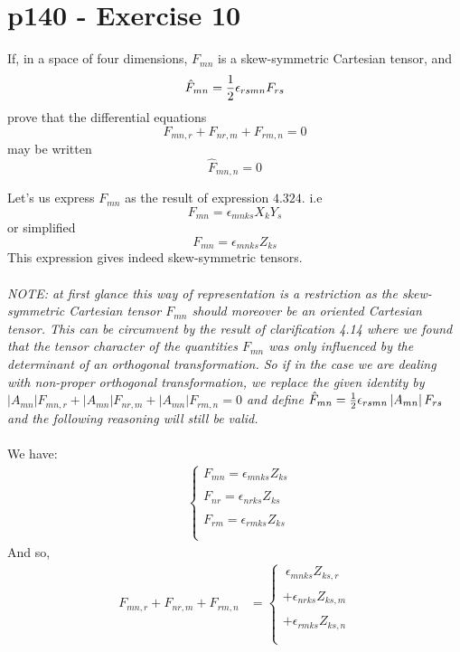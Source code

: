 \section{p140 - Exercise 10}
\begin{tcolorbox}
If, in a space of four dimensions, $F_{mn}$ is a skew-symmetric Cartesian tensor, and $$\hat{F}_{mn} = \frac{1}{2} \epsilon_{rsmn} F_{rs}$$
prove that the differential equations $$ F_{mn,r}+F_{nr,m}+F_{rm,n}=0$$ may be written $$\hat{F}_{mn,n} =0$$
\end{tcolorbox}
Let's us express $F_{mn}$ as the result of expression $\mathbf{4.324.} $ i.e $$F_{mn} = \epsilon_{mnks} X_kY_s$$ or simplified $$F_{mn} = \epsilon_{mnks} Z_{ks}$$
This expression gives indeed skew-symmetric tensors.\\\\
\textit{NOTE:  at first glance this way of representation is  a restriction as the  skew-symmetric Cartesian tensor $F_{mn}$ should moreover be an oriented Cartesian tensor. This can be circumvent by the result of clarification 4.14 where we found that the tensor character  of the quantities $F_{mn}$ was only influenced by the determinant of an orthogonal transformation. So if in the case we are dealing with non-proper orthogonal transformation,  we replace the given identity by   $ \left|A_{mn}\right|F_{mn,r}+\left|A_{mn}\right|F_{nr,m}+\left|A_{mn}\right|F_{rm,n}=0$ and define $\hat{F}_{mn} = \frac{1}{2} \epsilon_{rsmn}\left|A_{mn}\right| F_{rs}$ and the following reasoning will still be valid.}\\\\
 We have:
\begin{align}
&\left\{\begin{array}{l}
F_{mn} = \epsilon_{mnks} Z_{ks}\\\\
F_{nr} = \epsilon_{nrks} Z_{ks}\\\\
F_{rm} = \epsilon_{rmks} Z_{ks}\\\\
\end{array}\right.
\end{align}
And so, 
\begin{align}
F_{mn,r}+F_{nr,m}+F_{rm,n}&=\left\{\begin{array}{l}
\ \epsilon_{mnks} Z_{ks,r}\\\\
+\epsilon_{nrks} Z_{ks,m}\\\\
+\epsilon_{rmks} Z_{ks,n}\\\\
\end{array}\right.
\end{align}

